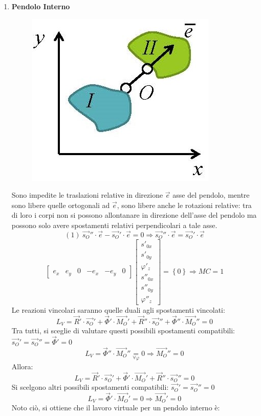 \documentclass{article}
\begin{document}
\begin{adjustwidth}{2in}{}
\begin{enumerate}
			\item \textbf{Pendolo Interno} \newline
				\begin{figure}[H]
				\centering
				\includegraphics[width=0.25\linewidth]{immagini/1.PARTE2_Pagina_06}
			\end{figure}
			Sono impedite le traslazioni relative in direzione $\vec{e}$ asse del pendolo, mentre sono libere quelle ortogonali ad $\vec{e}$, sono libere anche le rotazioni relative: tra di loro i corpi non si possono allontanare in direzione dell'asse del pendolo ma possono solo avere spostamenti relativi perpendicolari a tale asse.
			\[
			(1)~\vec{s_O}'' \cdot \vec{e} - \vec{s_O}' \cdot \vec{e} = 0 \Rightarrow \vec{s_O}'' \cdot \vec{e} = \vec{s_O}' \cdot \vec{e} 
			\]
			\[
			\left[ \begin{array}{cccccc}
				e_x & e_y & 0  & -e_x & -e_y & 0
			\end{array}\right] \left[ \begin{array}{c}
			s'_{0x} \\
			s'_{0y} \\
			\varphi'_z \\
			s''_{0x} \\
			s''_{0y} \\
			\varphi''_z
		\end{array}\right] = \left\lbrace 0 \right\rbrace \Rightarrow MC = 1
			\]
			Le reazioni vincolari saranno quelle duali agli spostamenti vincolati:
				\[
			L_{V} = \vec{R}' \cdot \vec{s_O}'+ \vec{\Phi}' \cdot \vec{M_O}'+ \vec{R}'' \cdot \vec{s_O}''+ \vec{\Phi}'' \cdot \vec{M_O}'' = 0
			\]
			Tra tutti, si sceglie di valutare questi possibili spostamenti compatibili: $ \vec{s_O}' = \vec{s_O}'' = \vec{\Phi}' = 0$
				\[
			L_{V} =  \vec{\Phi}'' \cdot \vec{M_O}'' \underset{\forall\varphi}{=} 0 \Rightarrow  \vec{M_O}'' = 0
			\]
			Allora: 
				\[
			L_{V} = \vec{R}' \cdot \vec{s_O}'+ \vec{\Phi}' \cdot \vec{M_O}'+ \vec{R}'' \cdot \vec{s_O}'' = 0
			\]
			Si scelgono altri possibili spostamenti compatibili: $ \vec{s_O}' = \vec{s_O}''= 0$
			\[
			L_{V} =  \vec{\Phi}' \cdot \vec{M_O}' = 0 \Rightarrow  \vec{M_O}' = 0
			\]	
			Noto ciò, si ottiene che il lavoro virtuale per un pendolo interno è: 

\end{enumerate}
\end{adjustwidth}
\end{document}
